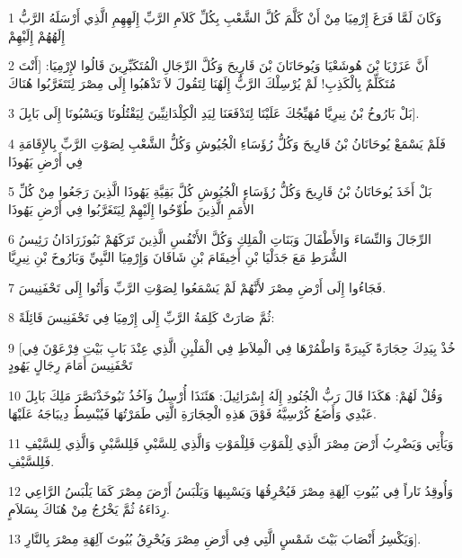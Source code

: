 \par 1 وَكَانَ لَمَّا فَرَغَ إِرْمِيَا مِنْ أَنْ كَلَّمَ كُلَّ الشَّعْبِ بِكُلِّ كَلاَمِ الرَّبِّ إِلَهِهِمِ الَّذِي أَرْسَلَهُ الرَّبُّ إِلَهُهُمْ إِلَيْهِمْ
\par 2 أَنَّ عَزَرْيَا بْنَ هُوشَعْيَا وَيُوحَانَانَ بْنَ قَارِيحَ وَكُلَّ الرِّجَالِ الْمُتَكَبِّرِينَ قَالُوا لإِرْمِيَا: [أَنْتَ مُتَكَلِّمٌ بِالْكَذِبِ! لَمْ يُرْسِلْكَ الرَّبُّ إِلَهُنَا لِتَقُولَ لاَ تَذْهَبُوا إِلَى مِصْرَ لِتَتَغَرَّبُوا هُنَاكَ
\par 3 بَلْ بَارُوخُ بْنُ نِيرِيَّا مُهَيِّجُكَ عَلَيْنَا لِتَدْفَعَنَا لِيَدِ الْكِلْدَانِيِّينَ لِيَقْتُلُونَا وَيَسْبُونَا إِلَى بَابِلَ].
\par 4 فَلَمْ يَسْمَعْ يُوحَانَانُ بْنُ قَارِيحَ وَكُلُّ رُؤَسَاءِ الْجُيُوشِ وَكُلُّ الشَّعْبِ لِصَوْتِ الرَّبِّ بِالإِقَامَةِ فِي أَرْضِ يَهُوذَا
\par 5 بَلْ أَخَذَ يُوحَانَانُ بْنُ قَارِيحَ وَكُلُّ رُؤَسَاءِ الْجُيُوشِ كُلَّ بَقِيَّةِ يَهُوذَا الَّذِينَ رَجَعُوا مِنْ كُلِّ الأُمَمِ الَّذِينَ طُوِّحُوا إِلَيْهِمْ لِيَتَغَرَّبُوا فِي أَرْضِ يَهُوذَا
\par 6 الرِّجَالَ وَالنِّسَاءَ وَالأَطْفَالَ وَبَنَاتِ الْمَلِكِ وَكُلَّ الأَنْفُسِ الَّذِينَ تَرَكَهُمْ نَبُوزَرَادَانُ رَئِيسُ الشُّرَطِ مَعَ جَدَلْيَا بْنِ أَخِيقَامَ بْنِ شَافَانَ وَإِرْمِيَا النَّبِيِّ وَبَارُوخَ بْنِ نِيرِيَّا
\par 7 فَجَاءُوا إِلَى أَرْضِ مِصْرَ لأَنَّهُمْ لَمْ يَسْمَعُوا لِصَوْتِ الرَّبِّ وَأَتُوا إِلَى تَحْفَنِيسَ.
\par 8 ثُمَّ صَارَتْ كَلِمَةُ الرَّبِّ إِلَى إِرْمِيَا فِي تَحْفَنِيسَ قَائِلَةً:
\par 9 [خُذْ بِيَدِكَ حِجَارَةً كَبِيرَةً وَاطْمُرْهَا فِي الْمِلاَطِ فِي الْمَلْبِنِ الَّذِي عِنْدَ بَابِ بَيْتِ فِرْعَوْنَ فِي تَحْفَنِيسَ أَمَامَ رِجَالٍ يَهُودٍ
\par 10 وَقُلْ لَهُمْ: هَكَذَا قَالَ رَبُّ الْجُنُودِ إِلَهُ إِسْرَائِيلَ: هَئَنَذَا أُرْسِلُ وَآخُذُ نَبُوخَذْنَصَّرَ مَلِكَ بَابِلَ عَبْدِي وَأَضَعُ كُرْسِيَّهُ فَوْقَ هَذِهِ الْحِجَارَةِ الَّتِي طَمَرْتُهَا فَيُبْسِطُ دِيبَاجَهُ عَلَيْهَا.
\par 11 وَيَأْتِي وَيَضْرِبُ أَرْضَ مِصْرَ الَّذِي لِلْمَوْتِ فَلِلْمَوْتِ وَالَّذِي لِلسَّبْيِ فَلِلسَّبْيِ وَالَّذِي لِلسَّيْفِ فَلِلسَّيْفِ.
\par 12 وَأُوقِدُ نَاراً فِي بُيُوتِ آلِهَةِ مِصْرَ فَيُحْرِقُهَا وَيَسْبِيهَا وَيَلْبَسُ أَرْضَ مِصْرَ كَمَا يَلْبَسُ الرَّاعِي رِدَاءَهُ ثُمَّ يَخْرُجُ مِنْ هُنَاكَ بِسَلاَمٍ.
\par 13 وَيَكْسِرُ أَنْصَابَ بَيْتَ شَمْسٍ الَّتِي فِي أَرْضِ مِصْرَ وَيُحْرِقُ بُيُوتَ آلِهَةِ مِصْرَ بِالنَّارِ].

